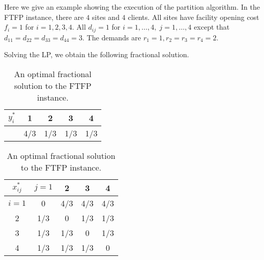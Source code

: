 \documentclass[11pt]{article}
\begin{document}
Here we give an example showing the execution of the
partition algorithm. In the FTFP instance, there are $4$
sites and $4$ clients. All sites have facility opening cost
$f_i=1$ for $i=1,2,3,4$. All $d_{ij}=1$ for $i=1,\ldots,4,\;
j=1,\ldots,4$ except that $d_{11} = d_{22} = d_{33} = d_{44}
= 3$. The demands are $r_1=1, r_2=r_3=r_4=2$.

Solving the LP, we obtain the following fractional solution.
\begin{table}[ht,center]
  \begin{subtable}{0.5\textwidth}
  \centering
  \begin{tabular}{c | c c c c}
    $y_i^\ast$ & 1 & 2 & 3 & 4\\
    \hline
    & 4/3 & 1/3 & 1/3 & 1/3\\
  \end{tabular}
\end{subtable}
%
\begin{subtable}{0.5\textwidth}
  \centering
  \begin{tabular}{c | c c c c}
    $x_{ij}^\ast$ & $j=1$ & 2 & 3 & 4\\
    \hline
    $i=1$ & 0 & 4/3 & 4/3 & 4/3\\
    2 & 1/3 & 0 & 1/3 & 1/3\\
    3 & 1/3 & 1/3 & 0 & 1/3\\
    4 & 1/3 & 1/3 & 1/3 & 0\\
  \end{tabular}
\end{subtable}
\caption{An optimal fractional solution to the FTFP instance.}
\end{table}
\end{document}
